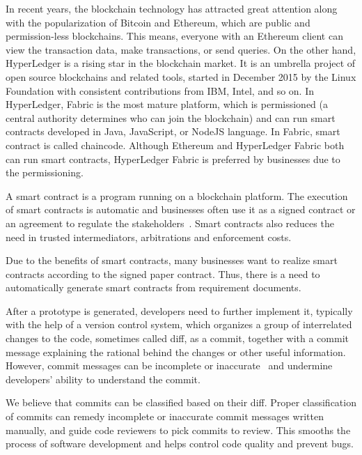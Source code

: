 
In recent years, the blockchain technology has attracted great attention along with the popularization of Bitcoin and Ethereum,
which are public and permission-less blockchains.
This means, everyone with an Ethereum client can view the transaction data, make transactions, or send queries.
On the other hand, HyperLedger is a rising star in the blockchain market. It is an umbrella project of open source blockchains and related tools, started in December 2015 by the Linux Foundation with consistent contributions from IBM, Intel, and so on.
In HyperLedger, Fabric is the most mature platform, which is permissioned (a central authority determines who can join the blockchain) and can run smart contracts developed in Java, JavaScript, or NodeJS language. In Fabric, smart contract is called chaincode. Although Ethereum and HyperLedger Fabric both can run smart contracts, HyperLedger Fabric is preferred by businesses due to the permissioning.

A smart contract is a program running on a blockchain platform.
The execution of smart contracts is automatic and businesses often use it as a signed contract or an agreement to regulate the stakeholders~\cite{savelyev2017contract}.
Smart contracts also reduces the need in trusted intermediators, arbitrations and enforcement costs.

Due to the benefits of smart contracts, many businesses want to realize smart contracts according to the signed paper contract. Thus, there is a need to automatically generate smart contracts from requirement documents.


After a prototype is generated, developers need to further implement it, typically with the help of a version control system,
which organizes a group of interrelated changes to the code, sometimes called diff, as a commit, together with a commit message explaining the rational behind the changes or other useful information.
However, commit messages can be incomplete or inaccurate~\cite{buse2010automatically} and undermine developers' ability to understand the commit.

We believe that commits can be classified based on their diff.
Proper classification of commits can remedy incomplete or inaccurate commit messages written manually, and
guide code reviewers to pick commits to review.
This smooths the process of software development and helps control code quality and prevent bugs.



